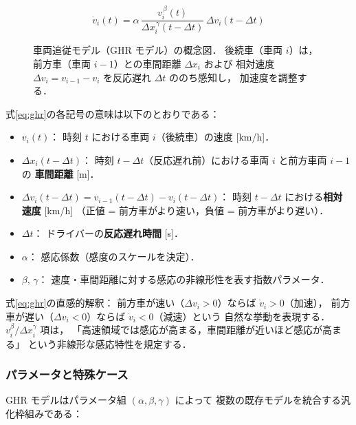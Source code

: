 \begin{equation}
  \dot{v}_i(t)
  = \alpha\,
    \frac{v_i^{\,\beta}(t)}
         {\Delta x_i^{\,\gamma}(t - \Delta t)}\,
    \Delta v_i(t - \Delta t)
  \label{eq:ghr}
\end{equation}

\begin{figure}[tb]
  \centering
  
  \caption{車両追従モデル（GHR モデル）の概念図．
           後続車（車両 $i$）は，前方車（車両 $i-1$）との車間距離 $\Delta x_i$ および
           相対速度 $\Delta v_i = v_{i-1} - v_i$ を反応遅れ $\Delta t$ ののち感知し，
           加速度を調整する．}
  \label{fig:car-following}
\end{figure}

式\eqref{eq:ghr}の各記号の意味は以下のとおりである：

\begin{itemize}
  \item $v_i(t)$：
    時刻 $t$ における車両 $i$（後続車）の速度 [km/h]．
  \item $\Delta x_i(t - \Delta t)$：
    時刻 $t - \Delta t$（反応遅れ前）における車両 $i$ と前方車両 $i-1$ の
    \textbf{車間距離} [m]．
  \item $\Delta v_i(t - \Delta t) = v_{i-1}(t-\Delta t) - v_i(t-\Delta t)$：
    時刻 $t - \Delta t$ における\textbf{相対速度} [km/h]
    （正値 = 前方車がより速い，負値 = 前方車がより遅い）．
  \item $\Delta t$：
    ドライバーの\textbf{反応遅れ時間} [s]．
  \item $\alpha$：
    感応係数（感度のスケールを決定）．
  \item $\beta,\, \gamma$：
    速度・車間距離に対する感応の非線形性を表す指数パラメータ．
\end{itemize}

式\eqref{eq:ghr}の直感的解釈：
前方車が速い（$\Delta v_i > 0$）ならば $\dot{v}_i > 0$（加速），
前方車が遅い（$\Delta v_i < 0$）ならば $\dot{v}_i < 0$（減速）という
自然な挙動を表現する．
$v_i^\beta / \Delta x_i^\gamma$ 項は，
「高速領域では感応が高まる，車間距離が近いほど感応が高まる」
という非線形な感応特性を規定する．

\subsubsection*{パラメータと特殊ケース}

GHR モデルはパラメータ組 $(\alpha, \beta, \gamma)$ によって
複数の既存モデルを統合する汎化枠組みである\cite{Gazis1961}：

